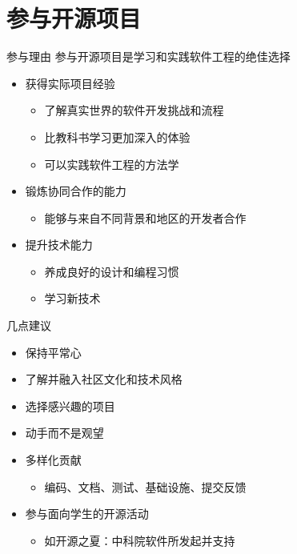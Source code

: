 \documentclass{beamer}
\begin{document}
\section{参与开源项目}
\label{sec:org564f51f}
\begin{frame}[label={sec:org00e1e2d}]{参与理由}
参与开源项目是学习和实践软件工程的绝佳选择
\begin{itemize}
\item 获得实际项目经验
\begin{itemize}
\item 了解真实世界的软件开发挑战和流程
\item 比教科书学习更加深入的体验
\item 可以实践软件工程的方法学
\end{itemize}
\item 锻炼协同合作的能力
\begin{itemize}
\item 能够与来自不同背景和地区的开发者合作
\end{itemize}
\item 提升技术能力
\begin{itemize}
\item 养成良好的设计和编程习惯
\item 学习新技术
\end{itemize}
\end{itemize}
\end{frame}

\begin{frame}[label={sec:orgd6f25ef}]{几点建议}
\begin{itemize}
\item 保持平常心
\item 了解并融入社区文化和技术风格
\item 选择感兴趣的项目
\item 动手而不是观望
\item 多样化贡献
\begin{itemize}
\item 编码、文档、测试、基础设施、提交反馈
\end{itemize}
\item 参与面向学生的开源活动
\begin{itemize}
\item 如开源之夏：中科院软件所发起并支持
\end{itemize}
\end{itemize}
\end{frame}
\end{document}
